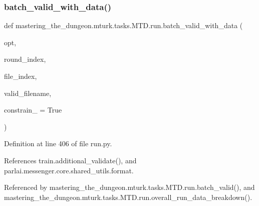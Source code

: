 \subsubsection{\texorpdfstring{batch\+\_\+valid\+\_\+with\+\_\+data()}{batch\_valid\_with\_data()}}
{\footnotesize\ttfamily def mastering\+\_\+the\+\_\+dungeon.\+mturk.\+tasks.\+M\+T\+D.\+run.\+batch\+\_\+valid\+\_\+with\+\_\+data (\begin{DoxyParamCaption}\item[{}]{opt,  }\item[{}]{round\+\_\+index,  }\item[{}]{file\+\_\+index,  }\item[{}]{valid\+\_\+filename,  }\item[{}]{constrain\+\_\+ = {\ttfamily True} }\end{DoxyParamCaption})}



Definition at line 406 of file run.\+py.



References train.\+additional\+\_\+validate(), and parlai.\+messenger.\+core.\+shared\+\_\+utils.\+format.



Referenced by mastering\+\_\+the\+\_\+dungeon.\+mturk.\+tasks.\+M\+T\+D.\+run.\+batch\+\_\+valid(), and mastering\+\_\+the\+\_\+dungeon.\+mturk.\+tasks.\+M\+T\+D.\+run.\+overall\+\_\+run\+\_\+data\+\_\+breakdown().

